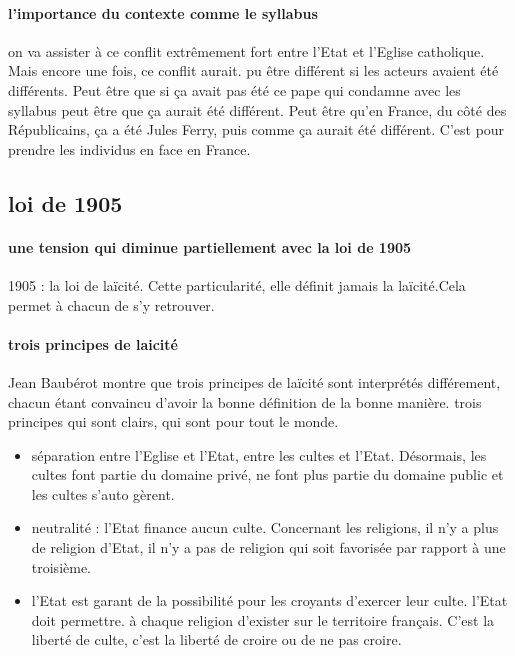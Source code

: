 \paragraph{l'importance du contexte comme le syllabus}
 on va assister à  ce conflit extrêmement fort entre l'Etat et l'Eglise catholique. Mais encore une fois, ce conflit aurait.
pu être différent si les acteurs avaient été différents. Peut être que si ça avait pas été ce pape qui condamne avec les syllabus   peut être que ça aurait été différent. Peut être qu'en France, du côté des Républicains, ça a été Jules Ferry, puis comme ça aurait été différent.
C'est pour prendre les individus en face en France. 

\subsection{loi de 1905}
\paragraph{une tension qui diminue partiellement avec la loi de 1905}
1905 : la loi de laïcité. Cette particularité, elle définit jamais la laïcité.Cela permet à  chacun de s'y retrouver. 


\paragraph{trois principes de laicité} 
Jean Baubérot 
montre que  trois principes de laïcité sont interprétés différement, chacun étant convaincu d'avoir la bonne définition de la bonne manière. 
trois principes qui sont clairs, qui sont pour tout le monde. 

\begin{itemize}
    \item  séparation entre l'Eglise et l'Etat, entre les cultes et l'Etat. Désormais, les cultes font partie du domaine privé, ne font plus partie du domaine public et les cultes s'auto gèrent.
\item neutralité :  l'Etat finance aucun culte. Concernant les religions, il n'y a plus de religion d'Etat, il n'y a pas de religion qui soit favorisée par rapport à  une troisième.
\item l'Etat est   garant de la possibilité pour les croyants d'exercer leur culte. l'Etat doit permettre.
à chaque religion d'exister sur le territoire français.
C'est la liberté de culte, c'est la liberté de croire ou de ne pas croire. 
\end{itemize} 
